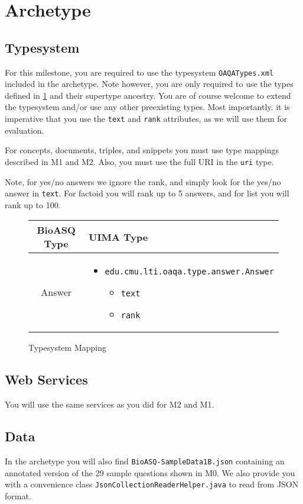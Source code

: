 \section{Archetype}
\subsection{Typesystem}
For this milestone, you are required to use the typesystem \verb|OAQATypes.xml| included in the archetype. Note however, you are only required to use the types defined in \ref{ref:mappings} and their supertype ancestry. You are of course welcome to extend the typesystem and/or use any other preexisting types. Most importantly. it is imperative that you use the \verb|text| and \verb|rank| attributes, as we will use them for evaluation. 

For concepts, documents, triples, and snippets you must use type mappings described in M1 and M2. Also, you must use the full URI in the \verb|uri| type.

Note, for yes/no answers we ignore the rank, and simply look for the yes/no answer in \verb|text|. For factoid you will rank up to 5 answers, and for list you will rank up to 100. 
\begin{figure}[h!]
\begin{longtable}{c|P{6cm}}
\textbf{BioASQ Type} & \textbf{UIMA Type}\\\hline
Answer &  \begin{itemize} \item \verb|edu.cmu.lti.oaqa.type.answer.Answer| \begin{itemize} \item \verb|text|  \item \verb|rank| \end{itemize}  \end{itemize} \\\hline
\end{longtable}
\label{ref:mappings}
\caption{Typesystem Mapping}
\end{figure}
\subsection{Web Services}
You will use the same services as you did for M2 and M1.
\subsection{Data}
In the archetype you will also find \verb|BioASQ-SampleData1B.json| containing an annotated version of the 29 sample questions shown in M0. We also provide you with a convenience class \verb|JsonCollectionReaderHelper.java| to read from JSON format. 


